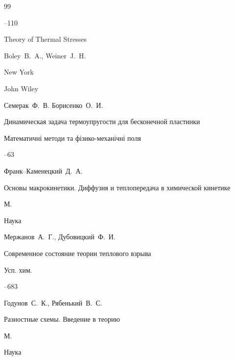 \begin{thebibliography}{99}



--110






\book Theory of Thermal Stresses

\by Boley~B.~A., Weiner~J.~H. 

\publaddr New York 

\publ John Wiley






\by Семерак~Ф.~В. Борисенко~О.~И.

\paper Динамическая задача термоупругости для бесконечной пластинки

\jour  Математичні методи та фізико-механічні поля



--63




\by Франк--Каменецкий~Д.~А.

\book  Основы макрокинетики. Диффузия и теплопередача в химической кинетике

\publaddr М.

\publ  Наука






\by Мержанов~А.~Г., Дубовицкий~Ф.~И.

\paper Современное состояние теории теплового взрыва

\jour Усп. хим.




--683







\by Годунов~С.~К., Рябенький~В.~С.

\book Разностные схемы. Введение в теорию

\publaddr  М.

\publ Наука









\end{thebibliography}



